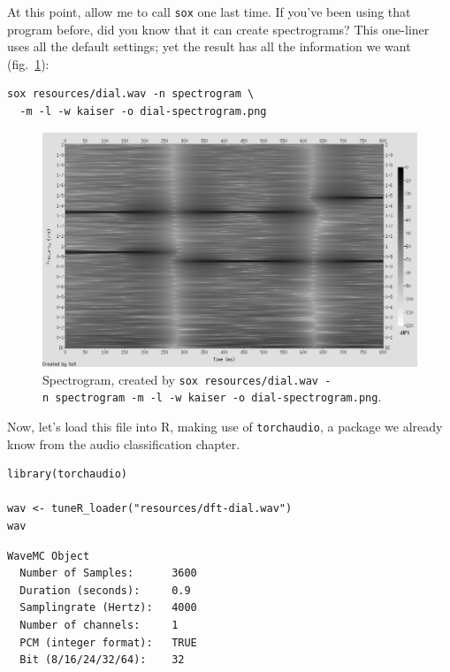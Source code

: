 \documentclass[
  letterpaper,
]{krantz}
\begin{document}
At this point, allow me to call \texttt{sox} one last time. If you've
been using that program before, did you know that it can create
spectrograms? This one-liner uses all the default settings; yet the
result has all the information we want (fig.~\ref{fig-dft-spectrogram}):

\begin{verbatim}
sox resources/dial.wav -n spectrogram \ 
  -m -l -w kaiser -o dial-spectrogram.png
\end{verbatim}

\begin{figure}[H]

{\centering \includegraphics{images/dft-dial-spectrogram.png}

}

\caption{\label{fig-dft-spectrogram}Spectrogram, created by
\texttt{sox\ resources/dial.wav\ -n\ spectrogram\ -m\ -l\ -w\ kaiser\ -o\ dial-spectrogram.png}.}

\end{figure}

Now, let's load this file into R, making use of \texttt{torchaudio}, a
package we already know from the audio classification chapter.

\begin{verbatim}
library(torchaudio)

wav <- tuneR_loader("resources/dft-dial.wav")
wav
\end{verbatim}

\begin{verbatim}
WaveMC Object
  Number of Samples:      3600
  Duration (seconds):     0.9
  Samplingrate (Hertz):   4000
  Number of channels:     1
  PCM (integer format):   TRUE
  Bit (8/16/24/32/64):    32
\end{verbatim}
\end{document}

